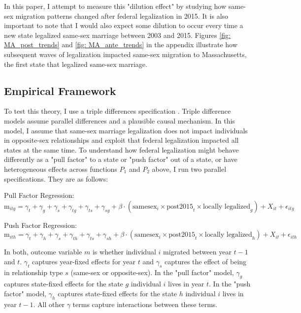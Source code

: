 \documentclass[12pt,letterpaper]{article}
\begin{document}
In this paper, I attempt to measure this "dilution effect" by studying how same-sex migration patterns changed after federal legalization in 2015. It is also important to note that I would also expect some dilution to occur every time a new state legalized same-sex marriage between 2003 and 2015. Figures \ref{fig: MA_post_trends} and \ref{fig: MA_ante_trends} in the appendix illustrate how subsequent waves of legalization impacted same-sex migration to Massachusetts, the first state that legalized same-sex marriage.

\subsection{Empirical Framework}

To test this theory, I use a triple differences specification \citep{23, 24, 25}. Triple difference models assume parallel differences and a plausible causal mechanism. In this model, I assume that same-sex marriage legalization does not impact individuals in opposite-sex relationships and exploit that federal legalization impacted all states at the same time. To understand how federal legalization might behave differently as a "pull factor" to a state or "push factor" out of a state, or have heterogeneous effects across functions $P_1$ and $P_2$ above, I run two parallel specifications. They are as follows:

\hfill
\break
Pull Factor Regression:
\begin{equation}
\text{m}_{itg} = \gamma_t + \gamma_g + \gamma_s + \gamma_{tg} + \gamma_{ts} + \gamma_{sg} + \beta \cdot (\text{samesex}_i \times \text{post2015}_t \times \text{locally legalized}_g) 
+ X_{it} + \epsilon_{itg}
\end{equation}

\hfill
\break
Push Factor Regression:
\begin{equation}
\text{m}_{ith} = \gamma_t + \gamma_h + \gamma_s + \gamma_{th} + \gamma_{ts} + \gamma_{sh} + \beta \cdot (\text{samesex}_i \times \text{post2015}_t \times \text{locally legalized}_h) 
+ X_{it} + \epsilon_{ith}
\end{equation}

In both, outcome variable $m$ is whether individual $i$ migrated between year $t-1$ and $t$. $\gamma_t$ captures year-fixed effects for year $t$ and $\gamma_s$ captures the effect of being in relationship type $s$ (same-sex or opposite-sex). In the "pull factor" model, $\gamma_g$ captures state-fixed effects for the state $g$ individual $i$ lives in year $t$. In the "push factor" model, $\gamma_h$ captures state-fixed effects for the state $h$ individual $i$ lives in year $t-1$. All other $\gamma$ terms capture interactions between these terms. 
\end{document}
